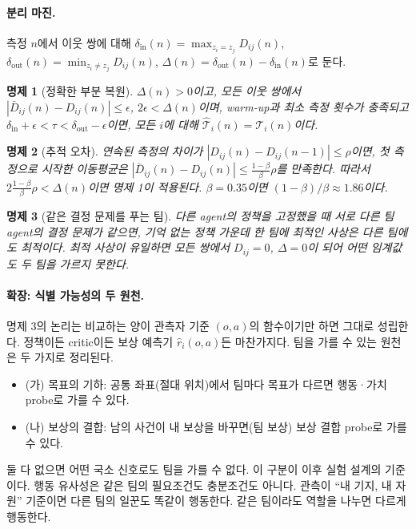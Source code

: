 \documentclass[11pt]{article}
\newtheorem{proposition}{명제}
\begin{document}
\paragraph{분리 마진.} 측정 $n$에서 이웃 쌍에 대해 $\delta_{\mathrm{in}}(n) = \max_{z_i = z_j} D_{ij}(n)$, $\delta_{\mathrm{out}}(n) = \min_{z_i \ne z_j} D_{ij}(n)$, $\Delta(n) = \delta_{\mathrm{out}}(n) - \delta_{\mathrm{in}}(n)$로 둔다.

\begin{proposition}[정확한 부분 복원]
$\Delta(n) > 0$이고, 모든 이웃 쌍에서 $|\bar D_{ij}(n) - D_{ij}(n)| \le \epsilon$, $2\epsilon < \Delta(n)$이며, warm-up과 최소 측정 횟수가 충족되고 $\delta_{\mathrm{in}} + \epsilon < \tau < \delta_{\mathrm{out}} - \epsilon$이면, 모든 $i$에 대해 $\hat{\mathcal{T}}_i(n) = \mathcal{T}_i(n)$이다.
\end{proposition}

\begin{proposition}[추적 오차]
연속된 측정의 차이가 $|D_{ij}(n) - D_{ij}(n-1)| \le \rho$이면, 첫 측정으로 시작한 이동평균은 $|\bar D_{ij}(n) - D_{ij}(n)| \le \frac{1-\beta}{\beta}\rho$를 만족한다. 따라서 $2\frac{1-\beta}{\beta}\rho < \Delta(n)$이면 명제 1이 적용된다. $\beta = 0.35$이면 $(1-\beta)/\beta \approx 1.86$이다.
\end{proposition}

\begin{proposition}[같은 결정 문제를 푸는 팀]
다른 agent의 정책을 고정했을 때 서로 다른 팀 agent의 결정 문제가 같으면, 기억 없는 정책 가운데 한 팀에 최적인 사상은 다른 팀에도 최적이다. 최적 사상이 유일하면 모든 쌍에서 $D_{ij} = 0$, $\Delta = 0$이 되어 어떤 임계값도 두 팀을 가르지 못한다.
\end{proposition}

\paragraph{확장: 식별 가능성의 두 원천.} 명제 3의 논리는 비교하는 양이 관측자 기준 $(o, a)$의 함수이기만 하면 그대로 성립한다. 정책이든 critic이든 보상 예측기 $\hat r_i(o,a)$든 마찬가지다. 팀을 가를 수 있는 원천은 두 가지로 정리된다.
\begin{itemize}
  \item (가) 목표의 기하: 공통 좌표(절대 위치)에서 팀마다 목표가 다르면 행동·가치 probe로 가를 수 있다.
  \item (나) 보상의 결합: 남의 사건이 내 보상을 바꾸면(팀 보상) 보상 결합 probe로 가를 수 있다.
\end{itemize}
둘 다 없으면 어떤 국소 신호로도 팀을 가를 수 없다. 이 구분이 이후 실험 설계의 기준이다.
행동 유사성은 같은 팀의 필요조건도 충분조건도 아니다. 관측이 ``내 기지, 내 자원'' 기준이면 다른 팀의 일꾼도 똑같이 행동한다. 같은 팀이라도 역할을 나누면 다르게 행동한다.
\end{document}
